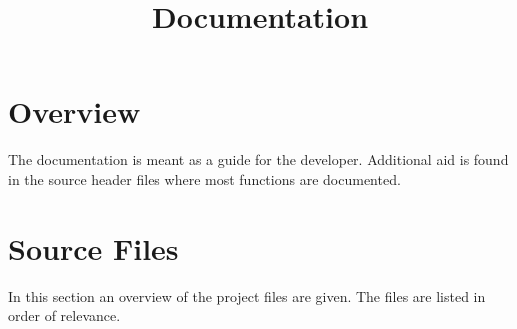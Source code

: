 \documentclass{awac02}
\title{Documentation}
\begin{document}
\maketitle

\section{Overview}

The documentation is meant as a guide for the developer. Additional aid is
found in the source header files where most functions are documented.

\section{Source Files}

In this section an overview of the project files are given.
The files are listed in order of relevance.
\end{document}
